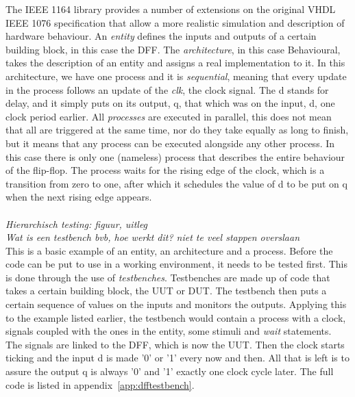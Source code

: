 \documentclass[11pt,british]{article}
\begin{document}
The \gls{IEEE} 1164 library provides a number of extensions on the original \gls{VHDL} IEEE 1076 specification that allow a more realistic simulation and description of hardware behaviour. An \emph{entity} defines the inputs and outputs of a certain building block, in this case the \gls{DFF}. The \emph{architecture}, in this case Behavioural, takes the description of an entity and assigns a real implementation to it. In this architecture, we have one process and it is \emph{sequential}, meaning that every update in the process follows an update of the \emph{clk}, the clock signal. The d stands for delay, and it simply puts on its output, q, that which was on the input, d, one clock period earlier. All \emph{processes} are executed in parallel, this does not mean that all are triggered at the same time, nor do they take equally as long to finish, but it means that any process can be executed alongside any other process. In this case there is only one (nameless) process that describes the entire behaviour of the flip-flop. The process waits for the rising edge of the clock, which is a transition from zero to one, after which it schedules the value of d to be put on q when the next rising edge appears.
\\
\\
\emph{\color{red}Hierarchisch testing: figuur, uitleg}\\
\emph{\color{red}Wat is een testbench bvb, hoe werkt dit? niet te veel stappen overslaan}\\
This is a basic example of an entity, an architecture and a process. Before the code can be put to use in a working environment, it needs to be tested first. This is done through the use of \emph{testbenches}. \cite{bergeron00} Testbenches are made up of code that takes a certain building block, the \gls{UUT} or \gls{DUT}. The testbench then puts a certain sequence of values on the inputs and monitors the outputs. Applying this to the example listed earlier, the testbench would contain a process with a clock, signals coupled with the ones in the entity, some stimuli and \emph{wait} statements. The signals are linked to the DFF, which is now the UUT. Then the clock starts ticking and the input d is made '0' or '1' every now and then. All that is left is to assure the output q is always '0' and '1' exactly one clock cycle later. The full code is listed in appendix~\ref{app:dfftestbench}.
\\
\\
\end{document}
